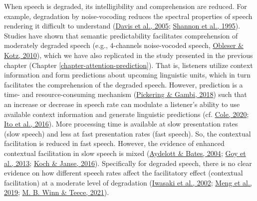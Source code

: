 \documentclass[a4paper, nobind]{templates/ociamthesis}
\begin{document}
When speech is degraded, its intelligibility and comprehension are reduced.
For example, degradation by noise-vocoding reduces the spectral properties of speech rendering it difficult to understand (\protect\hyperlink{ref-Davis2005}{Davis et al., 2005}; \protect\hyperlink{ref-Shannon1995}{Shannon et al., 1995}).
Studies have shown that semantic predictability facilitates comprehension of moderately degraded speech (e.g., 4-channels noise-vocoded speech, \protect\hyperlink{ref-Obleser2010}{Obleser \& Kotz, 2010}),
which we have also replicated in the study presented in the previous chapter (Chapter \ref{chapter-attention-prediction}).
That is, listeners utilize context information and form predictions about upcoming linguistic units,
which in turn facilitates the comprehension of the degraded speech.
However, prediction is a time- and resource-consuming mechanism (\protect\hyperlink{ref-Pickering2018}{Pickering \& Gambi, 2018}) such that an increase or decrease in speech rate can modulate a listener's ability to use available context information and generate linguistic predictions (cf. \protect\hyperlink{ref-Cole2020}{Cole, 2020}; \protect\hyperlink{ref-Ito2016}{Ito et al., 2016}).
More processing time is available at slow presentation rates (slow speech) and less at fast presentation rates (fast speech).
So, the contextual facilitation is reduced in fast speech.
However, the evidence of enhanced contextual facilitation in slow speech is mixed (\protect\hyperlink{ref-Aydelott2004}{Aydelott \& Bates, 2004}; \protect\hyperlink{ref-Goy2013}{Goy et al., 2013}; \protect\hyperlink{ref-Koch2016}{Koch \& Janse, 2016}).
Specifically for degraded speech, there is no clear evidence on how different speech rates affect the facilitatory effect (contextual facilitation) at a moderate level of degradation (\protect\hyperlink{ref-Iwasaki2002}{Iwasaki et al., 2002}; \protect\hyperlink{ref-Meng2019}{Meng et al., 2019}; \protect\hyperlink{ref-Winn2021}{M. B. Winn \& Teece, 2021}).
\end{document}
